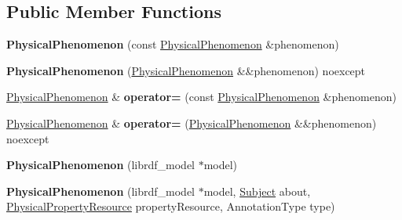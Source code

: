 \subsection*{Public Member Functions}
\begin{DoxyCompactItemize}
\item 
\mbox{\label{classsemsim_1_1PhysicalPhenomenon_ae0eb39856d1d847118dc14d8f6cdbe88}} 
{\bfseries Physical\+Phenomenon} (const \hyperlink{classsemsim_1_1PhysicalPhenomenon}{Physical\+Phenomenon} \&phenomenon)
\item 
\mbox{\label{classsemsim_1_1PhysicalPhenomenon_a5c96bf803ad7ed4b675f58ec3b28ae83}} 
{\bfseries Physical\+Phenomenon} (\hyperlink{classsemsim_1_1PhysicalPhenomenon}{Physical\+Phenomenon} \&\&phenomenon) noexcept
\item 
\mbox{\label{classsemsim_1_1PhysicalPhenomenon_a9880b73feb880ebde54cb43dcd10645f}} 
\hyperlink{classsemsim_1_1PhysicalPhenomenon}{Physical\+Phenomenon} \& {\bfseries operator=} (const \hyperlink{classsemsim_1_1PhysicalPhenomenon}{Physical\+Phenomenon} \&phenomenon)
\item 
\mbox{\label{classsemsim_1_1PhysicalPhenomenon_a173a2f18b7808fbdcf21317bc80088b5}} 
\hyperlink{classsemsim_1_1PhysicalPhenomenon}{Physical\+Phenomenon} \& {\bfseries operator=} (\hyperlink{classsemsim_1_1PhysicalPhenomenon}{Physical\+Phenomenon} \&\&phenomenon) noexcept
\item 
\mbox{\label{classsemsim_1_1PhysicalPhenomenon_a27f402b88ef569543730317fc9662c4c}} 
{\bfseries Physical\+Phenomenon} (librdf\+\_\+model $\ast$model)
\item 
\mbox{\label{classsemsim_1_1PhysicalPhenomenon_aab6825374a350a0fa83c4a54704ebfbc}} 
{\bfseries Physical\+Phenomenon} (librdf\+\_\+model $\ast$model, \hyperlink{classsemsim_1_1Subject}{Subject} about, \hyperlink{classsemsim_1_1PhysicalPropertyResource}{Physical\+Property\+Resource} property\+Resource, Annotation\+Type type)
\item 
\mbox{\label{classsemsim_1_1PhysicalPhenomenon_af3a680b3bacba8733eab51207fa8e223}} 

\end{DoxyCompactItemize}
